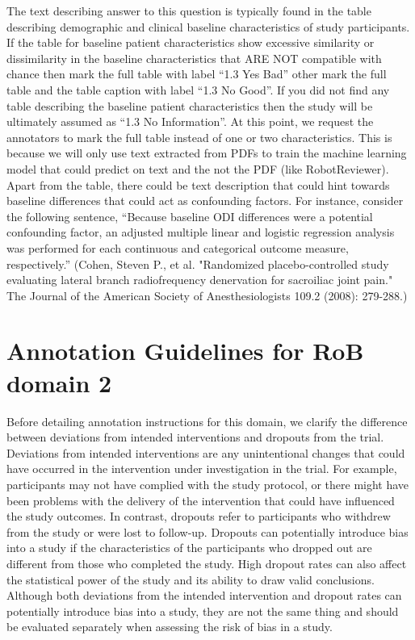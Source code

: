 \documentclass[sn-mathphys,Numbered]{sn-jnl}%
\begin{document}
The text describing answer to this question is typically found in the table describing demographic and clinical baseline characteristics of study participants.
If the table for baseline patient characteristics show excessive similarity or dissimilarity in the baseline characteristics that ARE NOT compatible with chance then mark the full table with label ``1.3 Yes Bad'' other mark the full table and the table caption with label ``1.3 No Good''.
If you did not find any table describing the baseline patient characteristics then the study will be ultimately assumed as ``1.3 No Information''.
At this point, we request the annotators to mark the full table instead of one or two characteristics.
This is because we will only use text extracted from PDFs to train the machine learning model that could predict on text and the not the PDF (like RobotReviewer).
Apart from the table, there could be text description that could hint towards baseline differences that could act as confounding factors.
For instance, consider the following sentence, ``Because baseline ODI differences were a potential confounding factor, an adjusted multiple linear and logistic regression analysis was performed for each continuous and categorical outcome measure, respectively.'' (Cohen, Steven P., et al. "Randomized placebo-controlled study evaluating lateral branch radiofrequency denervation for sacroiliac joint pain." The Journal of the American Society of Anesthesiologists 109.2 (2008): 279-288.)


%
%
%
\section*{Annotation Guidelines for RoB domain 2}
\label{sec:dom2}
%
Before detailing annotation instructions for this domain, we clarify the difference between deviations from intended interventions and dropouts from the trial.
Deviations from intended interventions are any unintentional changes that could have occurred in the intervention under investigation in the trial.
For example, participants may not have complied with the study protocol, or there might have been problems with the delivery of the intervention that could have influenced the study outcomes.
In contrast, dropouts refer to participants who withdrew from the study or were lost to follow-up.
Dropouts can potentially introduce bias into a study if the characteristics of the participants who dropped out are different from those who completed the study.
High dropout rates can also affect the statistical power of the study and its ability to draw valid conclusions.
Although both deviations from the intended intervention and dropout rates can potentially introduce bias into a study, they are not the same thing and should be evaluated separately when assessing the risk of bias in a study.
%
%
%
\end{document}
